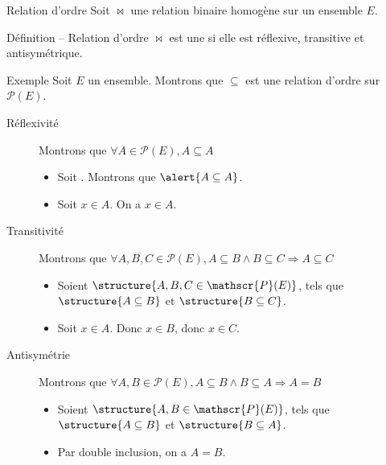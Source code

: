 
\begingroup

\begin{frame}{Relation d'ordre}
  \small 
  Soit $\bowtie$ une relation binaire homogène sur un ensemble $E$.

  \begin{block}{Définition -- Relation d'ordre}
    $\bowtie$ est une  si elle est \alert{réflexive}, \alert{transitive} et \alert{antisymétrique}.
  \end{block}
  \begin{exampleblock}{Exemple}
    Soit $E$ un ensemble. 
    Montrons que $\subseteq$ est une relation d'ordre sur $\mathscr{P}(E)$.
    \begin{description}
    \item[Réflexivité]  Montrons que \alert{$\forall A\in \mathscr{P}(E), A\subseteq A$}
      \begin{itemize}
      \item Soit . Montrons que $\alert{A\subseteq A}$.
      \item Soit $x\in A$. On a $x\in A$.
      \end{itemize}
    \item[Transitivité] Montrons que \alert{$\forall A, B, C \in \mathscr{P}(E), A \subseteq B \land B \subseteq C \Rightarrow A \subseteq C$}
      \begin{itemize}
      \item Soient $\structure{A, B, C \in \mathscr{P}(E)}$, tels que $\structure{A \subseteq B}$ et $\structure{B \subseteq C}$. 
      \item Soit $x \in A$. Donc $x\in B$, donc $x\in C$. 
      \end{itemize}
    \item[Antisymétrie] Montrons que \alert{$\forall A,B \in \mathscr{P}(E), A \subseteq B \land B \subseteq A \Rightarrow A=B$}
      \begin{itemize}
      \item Soient $\structure{A, B \in \mathscr{P}(E)}$, tels que $\structure{A \subseteq B}$ et $\structure{B \subseteq A}$. 
      \item Par double inclusion, on a $A=B$. 
      \end{itemize}
    \end{description}
  \end{exampleblock}
\end{frame}
\endgroup
